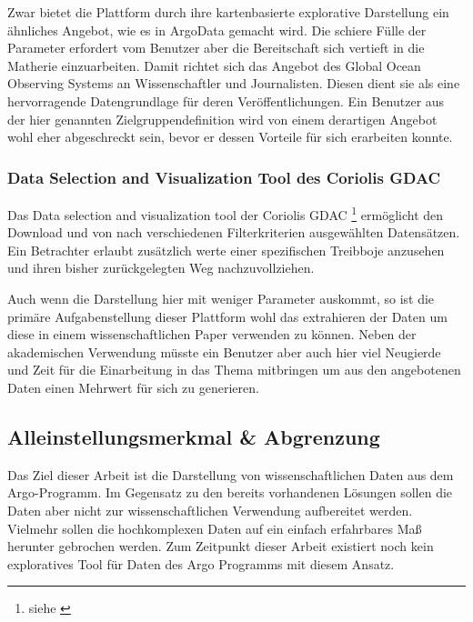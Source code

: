     Zwar bietet die Plattform durch ihre kartenbasierte explorative Darstellung ein ähnliches Angebot, wie es in ArgoData gemacht wird. Die schiere Fülle der Parameter erfordert vom Benutzer aber die Bereitschaft sich vertieft in die Matherie einzuarbeiten. Damit richtet sich das Angebot des Global Ocean Observing Systems an Wissenschaftler und Journalisten. Diesen dient sie als eine hervorragende Datengrundlage für deren Veröffentlichungen. Ein Benutzer aus der hier genannten Zielgruppendefinition wird von einem derartigen Angebot wohl eher abgeschreckt sein, bevor er dessen Vorteile für sich erarbeiten konnte. 
    
\subsubsection{Data Selection and Visualization Tool des Coriolis GDAC}
    
    Das Data selection and visualization tool der Coriolis GDAC \footnote { siehe \cite{ArgoDataSelection}} ermöglicht den Download und von nach verschiedenen Filterkriterien ausgewählten Datensätzen. Ein Betrachter erlaubt zusätzlich werte einer spezifischen Treibboje anzusehen und ihren bisher zurückgelegten Weg nachzuvollziehen.
    
    Auch wenn die Darstellung hier mit weniger Parameter auskommt, so ist die primäre Aufgabenstellung dieser Plattform wohl das extrahieren der Daten um diese in einem wissenschaftlichen Paper verwenden zu können. Neben der akademischen Verwendung müsste ein Benutzer aber auch hier viel Neugierde und Zeit für die Einarbeitung in das Thema mitbringen um aus den angebotenen Daten einen Mehrwert für sich zu generieren. 
    
    
\subsection{Alleinstellungsmerkmal \& Abgrenzung}
    
    Das Ziel dieser Arbeit ist die Darstellung von wissenschaftlichen Daten aus dem Argo-Programm. Im Gegensatz zu den bereits vorhandenen Lösungen sollen die Daten aber nicht zur wissenschaftlichen Verwendung aufbereitet werden. Vielmehr sollen die hochkomplexen Daten auf ein einfach erfahrbares Maß herunter gebrochen werden. Zum Zeitpunkt dieser Arbeit existiert noch kein exploratives Tool für Daten des Argo Programms mit diesem Ansatz.
    

